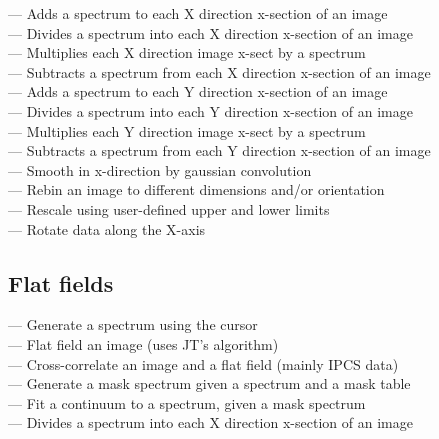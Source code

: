  --- Adds a spectrum to each X direction x-section of an image\\
 --- Divides a spectrum into each X direction x-section of an image\\
 --- Multiplies each X direction image x-sect by a spectrum\\
 --- Subtracts a spectrum from each X direction x-section of an image\\
 --- Adds a spectrum to each Y direction x-section of an image\\
 --- Divides a spectrum into each Y direction x-section of an image\\
 --- Multiplies each Y direction image x-sect by a spectrum\\
 --- Subtracts a spectrum from each Y direction x-section of an image\\
 --- Smooth in x-direction by gaussian convolution\\
 --- Rebin an image to different dimensions and/or orientation\\
 --- Rescale using user-defined upper and lower limits\\
 --- Rotate data along the X-axis


\subsection{\label{classifflats}Flat fields}

 --- Generate a spectrum using the cursor\\
 --- Flat field an image (uses JT's algorithm)\\
 --- Cross-correlate an image and a flat field (mainly IPCS data)\\
 --- Generate a mask spectrum given a spectrum and a mask table\\
 --- Fit a continuum to a spectrum, given a mask spectrum\\
 --- Divides a spectrum into each X direction x-section of an image

